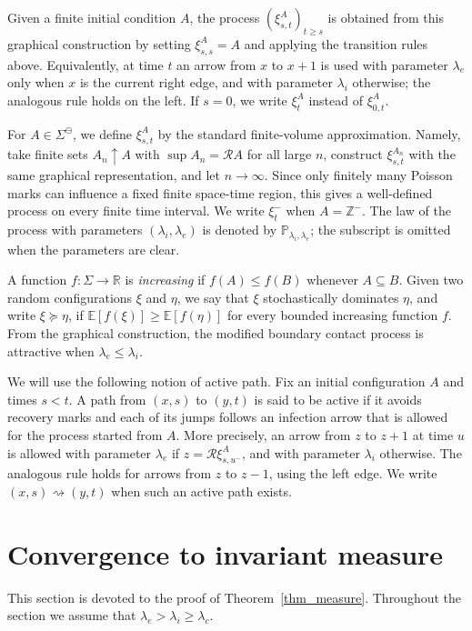 \documentclass[11pt,a4paper]{article}
\theoremstyle{plain}
\theoremstyle{definition}
\theoremstyle{remark}
\numberwithin{equation}{section}
\begin{document}
	Given a finite initial condition $A$, the process $(\xi^A_{s,t})_{t\ge s}$ is obtained from this graphical construction by setting $\xi^A_{s,s}=A$ and applying the transition rules above. Equivalently, at time $t$ an arrow from $x$ to $x+1$ is used with parameter $\lambda_e$ only when $x$ is the current right edge, and with parameter $\lambda_i$ otherwise; the analogous rule holds on the left. If $s=0$, we write $\xi_t^A$ instead of $\xi^A_{0,t}$.
	
	For $A\in\Sigma^{\ominus}$, we define $\xi^A_{s,t}$ by the standard finite-volume approximation. Namely, take finite sets $A_n\uparrow A$ with $\sup A_n=\mathcal{R}A$ for all large $n$, construct $\xi^{A_n}_{s,t}$ with the same graphical representation, and let $n\to\infty$. Since only finitely many Poisson marks can influence a fixed finite space-time region, this gives a well-defined process on every finite time interval. We write $\xi_t^-$ when $A=\mathbb{Z}^-$. The law of the process with parameters $(\lambda_i,\lambda_e)$ is denoted by $\mathbb{P}_{\lambda_i,\lambda_e}$; the subscript is omitted when the parameters are clear.
	
	A function $f:\Sigma\to\mathbb{R}$ is \emph{increasing} if $f(A)\le f(B)$ whenever $A\subseteq B$. Given two random configurations $\xi$ and $\eta$, we say that $\xi$ stochastically dominates $\eta$, and write $\xi\succcurlyeq\eta$, if $\mathbb{E}[f(\xi)]\ge\mathbb{E}[f(\eta)]$ for every bounded increasing function $f$. From the graphical construction, the modified boundary contact process is attractive when $\lambda_e\le\lambda_i$.
	
	We will use the following notion of active path. Fix an initial configuration $A$ and times $s<t$. A path from $(x,s)$ to $(y,t)$ is said to be active if it avoids recovery marks and each of its jumps follows an infection arrow that is allowed for the process started from $A$. More precisely, an arrow from $z$ to $z+1$ at time $u$ is allowed with parameter $\lambda_e$ if $z=\mathcal{R}\xi^A_{s,u^-}$, and with parameter $\lambda_i$ otherwise. The analogous rule holds for arrows from $z$ to $z-1$, using the left edge. We write $(x,s)\rightsquigarrow(y,t)$ when such an active path exists.
	
	
	\section{Convergence to invariant measure} \label{section_invariantmeasure}
	
	This section is devoted to the proof of Theorem~\ref{thm_measure}. Throughout the section we assume that $\lambda_e>\lambda_i\geq\lambda_c$.
	
\end{document}
